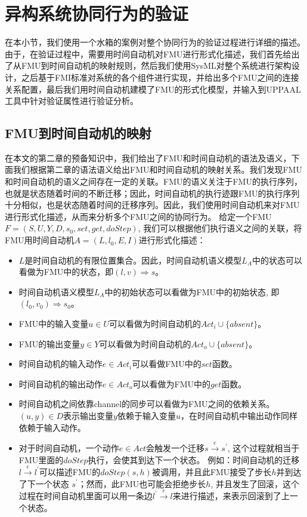 \section{异构系统协同行为的验证}
在本小节，我们使用一个水箱的案例对整个协同行为的验证过程进行详细的描述。由于，在验证过程中，需要用时间自动机对FMU进行形式化描述，我们首先给出了从FMU到时间自动机的映射规则，然后我们使用SysML对整个系统进行架构设计，之后基于FMI标准对系统的各个组件进行实现，并给出多个FMU之间的连接关系配置，最后我们用时间自动机建模了FMU的形式化模型，并输入到UPPAAL工具中针对验证属性进行验证分析。
\subsection{FMU到时间自动机的映射} 
在本文的第二章的预备知识中，我们给出了FMU和时间自动机的语法及语义，下面我们根据第二章的语法语义给出FMU和时间自动机的映射关系。我们发现FMU和时间自动机的语义之间存在一定的关联。FMU的语义关注于FMU的执行序列，也就是状态随着时间的不断迁移；因此，时间自动机的执行迹跟FMU的执行序列十分相似，也是状态随着时间的迁移序列。因此，我们使用时间自动机来对FMU进行形式化描述，从而来分析多个FMU之间的协同行为。
给定一个FMU$F=(S,U,Y,D,s_{0},set,get,doStep)$, 我们可以根据他们执行语义之间的关联，将FMU用时间自动机$\textit{A}=(L,l_{0},E,I)$进行形式化描述：
\begin{itemize}
\item
$L$是时间自动机的有限位置集合。因此，时间自动机语义模型$L_{\textit{A}}$中的状态可以看做为FMU中的状态，即$(l,v) \Rightarrow s$。
\item
时间自动机语义模型$L_{\textit{A}}$中的初始状态可以看做为FMU中的初始状态, 即$(l_{0},v_{0}) \Rightarrow s_{0}$。
\item
FMU中的输入变量$u \in U$可以看做为时间自动机的$Act_{i} \cup \{absent\}$。
\item
FMU的输出变量$y \in Y$可以看做为时间自动机的$Act_{o} \cup \{absent\}$。
\item
时间自动机的输入动作$e \in Act_{i}$可以看做FMU中的$set$函数。
\item
时间自动机的输出动作$e \in Act_{o}$可以看做为FMU中的$get$函数。  
\item
时间自动机之间依靠channel的同步可以看做为FMU之间的依赖关系。 $(u,y) \in D$表示输出变量$y$依赖于输入变量$u$，在时间自动机中输出动作同样依赖于输入动作。
\item
对于时间自动机，一个动作$e \in Act$会触发一个迁移$s \xrightarrow{e} s^{\prime}$, 这个过程就相当于FMU里面的$doStep$执行，会使其到达下一个状态。 例如：时间自动机的迁移$l \xrightarrow{e} l^{\prime}$可以描述FMU的$doStep(s,h)$被调用，并且此FMU接受了步长$h$并到达了下一个状态 $s^{\prime}$；然而，此FMU也可能会拒绝步长$h$, 并且发生了回滚，这个过程在时间自动机里面可以用一条边$l^{\prime} \xrightarrow{e} l$来进行描述，来表示回滚到了上一个状态。

\end{itemize}
